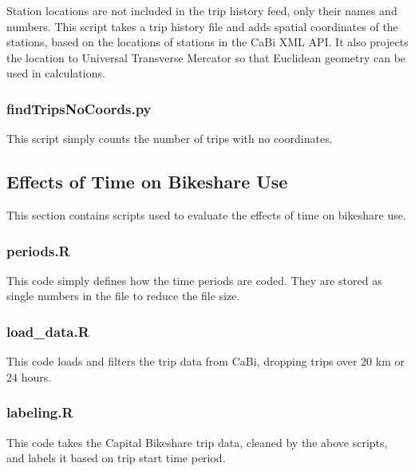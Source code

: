 \documentclass[letterpaper,11pt]{article}
\begin{document}
Station locations are not included in the trip history feed, only
their names and numbers. This script takes a trip history file and
adds spatial coordinates of the stations, based on the locations of
stations in the CaBi XML API. It also projects the location to
Universal Transverse Mercator so that Euclidean geometry can be used
in calculations.



\subsubsection{findTripsNoCoords.py}
\label{findTripsNoCoords.py}

This script simply counts the number of trips with no coordinates.



\subsection{Effects of Time on Bikeshare Use}

This section contains scripts used to evaluate the effects of time on
bikeshare use.

\subsubsection{periods.R}
\label{periods.R}

This code simply defines how the time periods are coded. They are
stored as single numbers in the file to reduce the file size.



\subsubsection{load\_data.R}
\label{load_data.R}

This code loads and filters the trip data from CaBi, dropping trips
over 20 km or 24 hours.



\subsubsection{labeling.R}
\label{labeling.R}

This code takes the Capital Bikeshare trip data, cleaned by the above
scripts, and labels it based on trip start time period.
\end{document}
